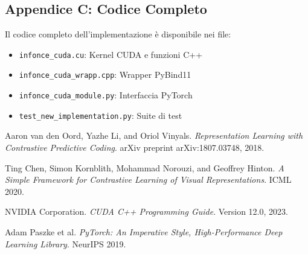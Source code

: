 \documentclass[a4paper,11pt]{article}
\begin{document}
\subsection{Appendice C: Codice Completo}

Il codice completo dell'implementazione è disponibile nei file:
\begin{itemize}
    \item \texttt{infonce\_cuda.cu}: Kernel CUDA e funzioni C++
    \item \texttt{infonce\_cuda\_wrapp.cpp}: Wrapper PyBind11
    \item \texttt{infonce\_cuda\_module.py}: Interfaccia PyTorch
    \item \texttt{test\_new\_implementation.py}: Suite di test
\end{itemize}


\begin{thebibliography}{9}

Aaron van den Oord, Yazhe Li, and Oriol Vinyals.
\textit{Representation Learning with Contrastive Predictive Coding}.
arXiv preprint arXiv:1807.03748, 2018.

Ting Chen, Simon Kornblith, Mohammad Norouzi, and Geoffrey Hinton.
\textit{A Simple Framework for Contrastive Learning of Visual Representations}.
ICML 2020.

NVIDIA Corporation.
\textit{CUDA C++ Programming Guide}.
Version 12.0, 2023.

Adam Paszke et al.
\textit{PyTorch: An Imperative Style, High-Performance Deep Learning Library}.
NeurIPS 2019.

\end{thebibliography}
\end{document}
